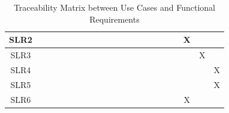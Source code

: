 \documentclass[12pt]{article}
\begin{document}
\begin{landscape}
\begin{table}[h!]
{\begin{tabular}{|c|c|c|c|c|c|c|c|c|c|c|c|c|c|c|c|c|c|c|c|c|}
            SLR2  &   &   &   &   &   &   &   &   &   &    &    &    &    &    &    &    &  & X&  & \\ \hline
            SLR3  &   &   &   &   &   &   &   &   &   &    &    &    &    &    &    &    &  &  & X&\\ \hline
            SLR4  &   &   &   &   &   &   &   &   &   &    &    &    &    &    &    &    &  &  &  & X\\ \hline
            SLR5  &   &   &   &   &   &   &   &   &   &    &    &    &    &    &    &    &  &  &  & X\\ \hline
            SLR6  &   &   &   &   &   &   &   &   &   &    &    &    &    &    &    &    &  & X&  &\\ \hline
        \end{tabular}%
        }
        \caption{Traceability Matrix between Use Cases and Functional Requirements}
    \end{table}

\end{landscape}
\restoregeometry
\end{document}
